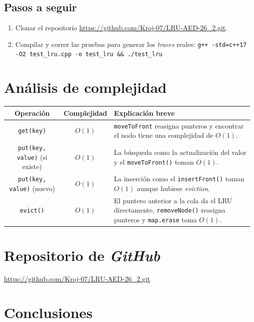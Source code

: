 \documentclass[a4paper, table]{article}
\begin{document}
\subsection{Pasos a seguir}

\begin{enumerate}
    \item Clonar el repositorio \url{https://github.com/Kroj-07/LRU-AED-26_2.git}.
    \item Compilar y correr las pruebas para generar los \textit{traces} reales: \texttt{g++ -std=c++17 -O2 test\_lru.cpp -o test\_lru \&\& ./test\_lru}
\end{enumerate}

\section{Análisis de complejidad}

    \begin{table}[H]        
        \begin{tabular}{|c|c|p{5.5cm}|} 
            \hline \textbf{Operación} & \textbf{Complejidad} & \textbf{Explicación breve}\\
            \hline \texttt{get(key)} & $O(1)$ & \texttt{moveToFront} reasigna punteros y encontrar el nodo tiene una complejidad de $O(1)$. \\
            \hline \texttt{put(key, value)} (si existe) & $O(1)$ & La búsqueda como la actualización del valor y el \texttt{moveToFront()} toman $O(1)$. \\
            \hline \texttt{put(key, value)} (nuevo) & $O(1)$ & La inserción como el \texttt{insertFront()} toman $O(1)$ aunque hubiese \textit{eviction}. \\
            \hline \texttt{evict()} & $O(1)$ & El puntero anterior a la cola da el LRU directamente, \texttt{removeNode()} reasigna punteros y \texttt{map.erase} toma $O(1)$. \\ \hline
        \end{tabular}    
    \end{table}

\section{Repositorio de \textit{GitHub}}

\url{https://github.com/Kroj-07/LRU-AED-26_2.git}

\section{Conclusiones}
\end{document}
